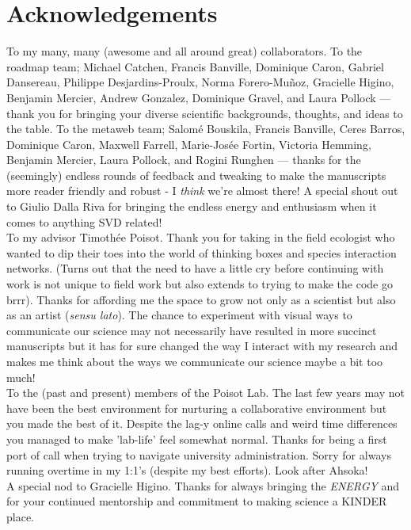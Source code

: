 \documentclass[12pt,oneside,phd]{dms}
\numberwithin{equation}{section}
\numberwithin{table}{chapter}
\numberwithin{figure}{chapter}
\begin{document}
\chapter*{Acknowledgements}

To my many, many (awesome and all around great) collaborators. To the roadmap team; Michael Catchen, Francis Banville, Dominique Caron, Gabriel Dansereau, Philippe Desjardins-Proulx, Norma Forero-Muñoz, Gracielle Higino, Benjamin Mercier, Andrew Gonzalez, Dominique Gravel, and Laura Pollock --- thank you for bringing your diverse scientific backgrounds, thoughts, and ideas to the table. To the metaweb team; Salomé Bouskila, Francis Banville, Ceres Barros, Dominique Caron, Maxwell Farrell, Marie-Josée Fortin, Victoria Hemming, Benjamin Mercier, Laura Pollock, and Rogini Runghen --- thanks for the (seemingly) endless rounds of feedback and tweaking to make the manuscripts more reader friendly and robust - I \emph{think} we're almost there! A special shout out to Giulio Dalla Riva for bringing the endless energy and enthusiasm when it comes to anything SVD related!\\

To my advisor Timothée Poisot. Thank you for taking in the field ecologist who wanted to dip their toes into the world of thinking boxes and species interaction networks. (Turns out that the need to have a little cry before continuing with work is not unique to field work but also extends to trying to make the code go brrr). Thanks for affording me the space to grow not only as a scientist but also as an artist (\emph{sensu lato}). The chance to experiment with visual ways to communicate our science may not necessarily have resulted in more succinct manuscripts but it has for sure changed the way I interact with my research and makes me think about the ways we communicate our science maybe a bit too much!\\

To the (past and present) members of the Poisot Lab. The last few years may not have been the best environment for nurturing a collaborative environment but you made the best of it. Despite the lag-y online calls and weird time differences you managed to make 'lab-life' feel somewhat normal. Thanks for being a first port of call when trying to navigate university administration. Sorry for  always running overtime in my 1:1's (despite my best efforts). Look after Ahsoka!\\

A special nod to Gracielle Higino. Thanks for always bringing the \emph{ENERGY} and for your continued mentorship and  commitment to making science a KINDER place.\\
\end{document}
